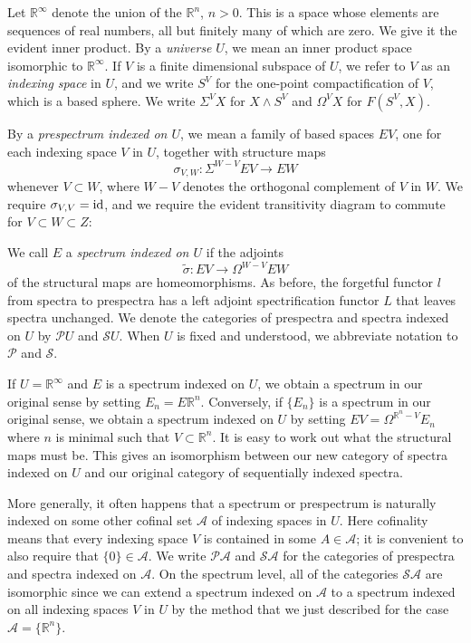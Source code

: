 Let $\mathbb{R}^\infty$ denote the union of the $\mathbb{R}^n$, $n > 0$. This is a space whose elements are sequences of real numbers, all but finitely many of which are zero. We give it the evident inner product. By a \emph{universe} $U$, we mean an inner product space isomorphic to $\mathbb{R}^\infty$. If $V$ is a finite dimensional subspace of $U$, we refer to $V$ as an \emph{indexing space} in $U$, and we write $S^V$ for the one-point compactification of $V$, which is a based sphere. We write $\Sigma^V X$ for $X \wedge S^V$ and $\Omega^V X$ for $F(S^V, X)$.

By a \emph{prespectrum indexed on $U$}, we mean a family of based spaces $EV$, one for each indexing space $V$ in $U$, together with structure maps
\[ \sigma_{V,W}: \Sigma^{W-V} EV \longrightarrow EW \]
whenever $V \subset W$, where $W-V$ denotes the orthogonal complement of $V$ in $W$. We require $\sigma_{V,V} = \operatorname{id}$, and we require the evident transitivity diagram to commute for $V \subset W \subset Z$:

\begin{center}
\end{center}

We call $E$ a \emph{spectrum indexed on $U$} if the adjoints
\[ \tilde{\sigma}: EV \longrightarrow \Omega^{W-V} EW \]
of the structural maps are homeomorphisms. As before, the forgetful functor $l$ from spectra to prespectra has a left adjoint spectrification functor $L$ that leaves spectra unchanged. We denote the categories of prespectra and spectra indexed on $U$ by $\mathscr{P}U$ and $\mathscr{S}U$. When $U$ is fixed and understood, we abbreviate notation to $\mathscr{P}$ and $\mathscr{S}$.

If $U = \mathbb{R}^\infty$ and $E$ is a spectrum indexed on $U$, we obtain a spectrum in our original sense by setting $E_n = E\mathbb{R}^n$. Conversely, if $\{E_n\}$ is a spectrum in our original sense, we obtain a spectrum indexed on $U$ by setting $EV = \Omega^{\mathbb{R}^n-V} E_n$ where $n$ is minimal such that $V \subset \mathbb{R}^n$. It is easy to work out what the structural maps must be. This gives an isomorphism between our new category of spectra indexed on $U$ and our original category of sequentially indexed spectra.

More generally, it often happens that a spectrum or prespectrum is naturally indexed on some other cofinal set $\mathscr{A}$ of indexing spaces in $U$. Here cofinality means that every indexing space $V$ is contained in some $A \in \mathscr{A}$; it is convenient to also require that $\{0\} \in \mathscr{A}$. We write $\mathscr{P}\mathscr{A}$ and $\mathscr{S}\mathscr{A}$ for the categories of prespectra and spectra indexed on $\mathscr{A}$. On the spectrum level, all of the categories $\mathscr{S}\mathscr{A}$ are isomorphic since we can extend a spectrum indexed on $\mathscr{A}$ to a spectrum indexed on all indexing spaces $V$ in $U$ by the method that we just described for the case $\mathscr{A} = \{\mathbb{R}^n\}$.

